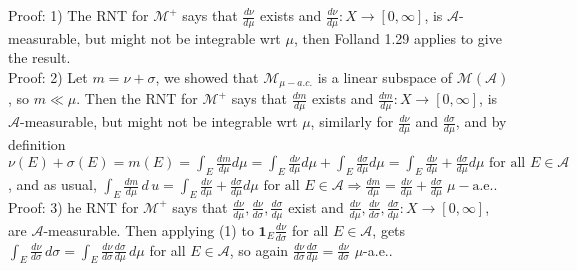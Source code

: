 \documentclass[12pt]{article}
\newcommand{\fall}[0] { \textrm{ for all } }
\newcommand{\aew}[0] { \textrm{a.e.} }
\newcommand{\A}[0] { \mathcal{A} }
\newcommand{\M}[0] { \mathcal{M} }
\newcommand{\rimply}[0] { \Rightarrow }
\newcommand{\rarw}[0] { \rightarrow }
\newcommand{ \cf }[1] { \mathbf{1}_{#1} }
\begin{document}
\noindent
Proof: 1) The RNT for $\M^+$ says that $\frac{d\nu}{d\mu}$ exists and $\frac{d\nu}{d\mu}: X \rarw [0,\infty]$, is $\A$-measurable, but might not be integrable wrt $\mu$, then Folland 1.29 applies to give the result. \\


\noindent
Proof: 2) Let $m = \nu + \sigma$, we showed that $\M_{\mu-a.c.}$ is a linear subspace of $\M(\A)$, so $m \ll \mu$. Then the RNT for $\M^+$ says that $\frac{dm}{d\mu}$ exists and $\frac{dm}{d\mu}: X \rarw [0,\infty]$, is $\A$-measurable, but might not be integrable wrt $\mu$, similarly for $\frac{d\nu}{d\mu}$ and $\frac{d\sigma}{d\mu}$, and by definition $\nu(E) + \sigma(E) = m(E) = \int_E \frac{dm}{d\mu} d\mu = \int_E \frac{d\nu}{d\mu} d\mu + \int_E \frac{d\sigma}{d\mu} d\mu = \int_E \frac{d\nu}{d\mu} + \frac{d\sigma}{d\mu} d\mu \fall E \in \A$, and as usual, $\int_E \frac{dm}{d\mu} \, d\,u = \int_E \frac{d\nu}{d\mu} + \frac{d\sigma}{d\mu} d\mu \fall E \in \A \rimply \frac{dm}{d\mu} = \frac{d\nu}{d\mu} + \frac{d\sigma}{d\mu} \; \mu - \aew$.  \\


\noindent
Proof: 3)  he RNT for $\M^+$ says that $\frac{d\nu}{d\mu},\frac{d\nu}{d\sigma},\frac{d\sigma}{d\mu} $ exist and $\frac{d\nu}{d\mu},\frac{d\nu}{d\sigma},\frac{d\sigma}{d\mu}: X \rarw [0,\infty]$, are $\A$-measurable. Then applying (1) to $\cf{E}\frac{d\nu}{d\sigma}$ for all $E \in \A$, gets $ \int_E \frac{d\nu}{d\sigma} \, d\sigma = \int_E \frac{d\nu}{d\sigma} \frac{d\sigma}{d\mu} \, d\mu$ for all $E \in \A$, so again $ \frac{d\nu}{d\sigma} \frac{d\sigma}{d\mu}  = \frac{d\nu}{d\sigma}$ $\mu$-a.e..\\
\end{document}
